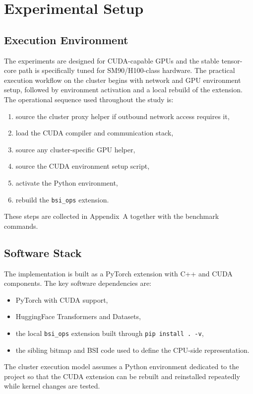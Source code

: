\chapter{Experimental Setup}

\section{Execution Environment}
The experiments are designed for CUDA-capable GPUs and the stable tensor-core path is specifically tuned for SM90/H100-class hardware. The practical execution workflow on the cluster begins with network and GPU environment setup, followed by environment activation and a local rebuild of the extension. The operational sequence used throughout the study is:

\begin{enumerate}[leftmargin=2em]
\item source the cluster proxy helper if outbound network access requires it,
\item load the CUDA compiler and communication stack,
\item source any cluster-specific GPU helper,
\item source the CUDA environment setup script,
\item activate the Python environment,
\item rebuild the \texttt{bsi\_ops} extension.
\end{enumerate}

These steps are collected in Appendix~A together with the benchmark commands.

\section{Software Stack}
The implementation is built as a PyTorch extension with C++ and CUDA components. The key software dependencies are:

\begin{itemize}[leftmargin=2em]
\item PyTorch with CUDA support,
\item HuggingFace Transformers and Datasets,
\item the local \texttt{bsi\_ops} extension built through \texttt{pip install . -v},
\item the sibling bitmap and BSI code used to define the CPU-side representation.
\end{itemize}

The cluster execution model assumes a Python environment dedicated to the project so that the CUDA extension can be rebuilt and reinstalled repeatedly while kernel changes are tested.

